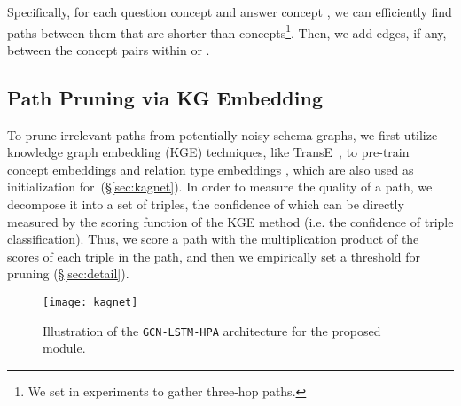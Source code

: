 \documentclass[11pt,a4paper]{article}
\newcommand{\secref}[1]{\S\ref{#1}}
\begin{document}
Specifically, for each question concept  and answer concept , we can efficiently find paths between them that are shorter than  concepts\footnote{We set  in experiments to gather three-hop paths.}.
Then, we add edges, if any, between the concept pairs within
  or .
































































\subsection{Path Pruning via KG Embedding}
\label{sec:pruning}
To prune irrelevant paths from potentially noisy schema graphs, 
we first utilize knowledge graph embedding (KGE) techniques, like TransE~\cite{Wang2014KnowledgeGE}, to pre-train concept embeddings  and relation type embeddings , which are also used as initialization for~\KagNet (\secref{sec:kagnet}).
In order to measure the quality of a path, we decompose it into a set of triples, the confidence of which can be directly measured by the scoring function of the KGE method (i.e. the confidence of triple classification).
Thus, we score a path with the multiplication product of the scores of each triple in the path, and then we empirically set a threshold for pruning (\secref{sec:detail}).  


 \begin{figure*}
\centering
	\texttt{[image: kagnet]}
\caption{Illustration of the \texttt{GCN-LSTM-HPA} architecture for the proposed \KagNet module.}
	\label{fig:kagnet}
\end{figure*}
\end{document}
